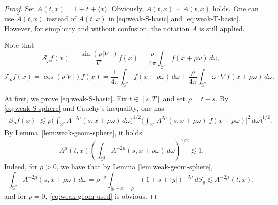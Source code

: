 \documentclass[11pt,twoside]{article}
\def\ls{\lesssim}
\theoremstyle{plain}
\theoremstyle{definition}
\theoremstyle{assumption}
\numberwithin{equation}{section}
\begin{document}
			\begin{proof}
				Set $\widetilde A(t,x)=1+t+\langle x\rangle$.
				Obviously, $A(t,x)\sim \widetilde A(t,x)$ holds. One can use $\widetilde A(t,x)$
instead of $A(t,x)$ in \eqref{eq:weak-S-basic} and \eqref{eq:weak-T-basic}.
However, for simplicity and without confusion, the notation \(A\) is still applied.
				
				Note that
				\begin{equation}\label{eq:weak-S-sphere}
					\mathcal{S}_{\rho} f(x)
					=
					\frac{\sin(\rho|\nabla|)}{|\nabla|}f(x)
					=
					\frac{\rho}{4\pi}
					\int_{\mathbb S^2}f(x+\rho\omega)\,d\omega,
				\end{equation}
				\begin{equation}\label{eq:weak-T-sphere}
					\mathcal{T}_\rho f(x)
					=
					\cos(\rho|\nabla|)f(x)
					=
					\frac{1}{4\pi}
					\int_{\mathbb S^2}f(x+\rho\omega)\,d\omega
					+
					\frac{\rho}{4\pi}
					\int_{\mathbb S^2}
					\omega\cdot\nabla f(x+\rho\omega)\,d\omega.
				\end{equation}
				
				At first, we prove \eqref{eq:weak-S-basic}. Fix \(t\in[s,T]\) and set
				$
				\rho=t-s.
				$
				By \eqref{eq:weak-S-sphere} and Cauchy's inequality, one has
				\begin{equation}
					\label{eq:weak-S-CS}
					\begin{aligned}
						|\mathcal S_\rho f(x)|
						\lesssim
						\rho
						\big(
						\int_{\mathbb S^2}
						A^{-2\mu}(s,x+\rho\omega)\,d\omega
						\big)^{1/2}
						\big(
						\int_{\mathbb S^2}
						A^{2\mu}(s,x+\rho\omega)
						|f(x+\rho\omega)|^2\,d\omega
						\big)^{1/2}.
					\end{aligned}
				\end{equation}
				By Lemma~\ref{lem:weak-geom-sphere}, it holds
				\begin{equation}
					\label{eq:weak-geom-used}
					A^\mu(t,x)
					\left(
					\int_{\mathbb S^2}
					A^{-2\mu}(s,x+\rho\omega)\,d\omega
					\right)^{1/2}
					\ls 1.
				\end{equation}
				Indeed, for \(\rho>0\), we have that by Lemma \ref{lem:weak-geom-sphere},
				\[
				\int_{\mathbb S^2}
				A^{-2\mu}(s,x+\rho\omega)\,d\omega
				=
				\rho^{-2}
				\int_{|y-x|=\rho}
				(1+s+|y|)^{-2\mu}\,dS_y\ls
				A^{-2\mu}(t,x),
				\]
				and for \(\rho=0\),  \eqref{eq:weak-geom-used} is obvious.
				

\end{proof}
\end{document}
